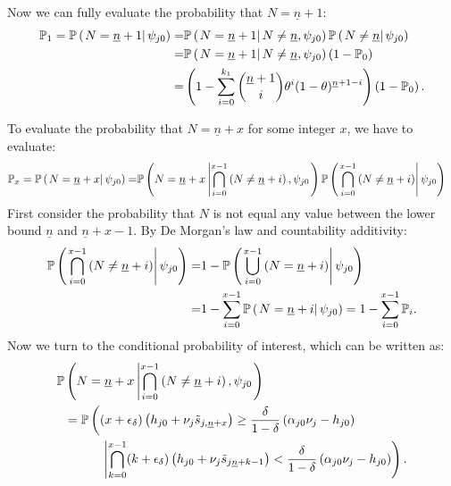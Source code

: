 Now we can fully evaluate the probability that $N = \underline{n} + 1$:
\begin{align*}
    \mathbb{P}_1 
    = 
    \mathbb{P} \left( \left. N = \underline{n} + 1 \right\vert \psi_{j0} \right) 
    =& 
    \mathbb{P} \left( \left. N = \underline{n} + 1 \right\vert N \neq \underline{n}, \psi_{j0} \right)
    \mathbb{P} \left( \left. N \neq \underline{n} \right\vert \psi_{j0} \right)
    \\
    =&
    \mathbb{P} \left( \left. N = \underline{n} + 1 \right\vert N \neq \underline{n}, \psi_{j0} \right) 
    \left( 1 - \mathbb{P}_0 \right)
    \\
    =&
    \left( 1 
        - 
        \sum_{i=0}^{k_1}
        \binom{\underline{n} + 1}{i}
        \theta^i
        (1 - \theta)^{\underline{n} + 1 - i}
     \right)
\left( 1 - \mathbb{P}_0 \right).
\end{align*}

To evaluate the probability that $N = \underline{n} + x$ for some integer $x$, we have to evaluate:
\begin{align*}
    \mathbb{P}_x = \mathbb{P} \left( \left. N = \underline{n} + x \right\vert \psi_{j0} \right) 
    =&
    \mathbb{P}  \left( 
        N = \underline{n} + x
     \left\vert 
    \bigcap_{i=0}^{x-1}
        \left( N \neq \underline{n} + i \right)
    , \psi_{j0} \right. \right)
    \mathbb{P} \left( \left. 
        \bigcap_{i=0}^{x-1}
        \left( N \neq \underline{n} + i \right)
     \right\vert \psi_{j0} \right)  
\end{align*} 
First consider the probability that $N$ is not equal any value between the lower bound $\underline{n}$ and $\underline{n} + x - 1$. By De Morgan's law and countability additivity:
\begin{align*}
    \mathbb{P} \left( \left. 
        \bigcap_{i=0}^{x-1}
        \left( N \neq \underline{n} + i \right)
     \right\vert \psi_{j0} \right)
    =&
    1
    -
    \mathbb{P}
    \left( \left. 
        \bigcup_{i=0}^{x-1}
        \left( N = \underline{n} + i \right)
     \right\vert \psi_{j0} \right)
    \\
    =&
    1
    -
    \sum_{i=0}^{x-1}
    \mathbb{P}
    \left( \left. 
        N = \underline{n} + i
     \right\vert \psi_{j0} \right)
    =
    1
    -
    \sum_{i=0}^{x-1}
    \mathbb{P}_i.
\end{align*}
Now we turn to the conditional probability of interest, which can be written as:
\begin{align}
    \nonumber
    \PP  &\pr{\crs{
        N = \underline{n} + x
    }{
    \bigcap_{i=0}^{x-1}
        \pr{N \neq \underline{n} + i}
    , \psi_{j0}}}
    \\ 
    \label{eq:prob_n_plus_x_long}
    &=
    \PP \left( 
        (x + \epsilon_\delta)
        \pr{h_{j0} + \nu_j \ks[, \underline{n} +x]
        }
        \geq
        \frac{\delta}{1 - \delta}
        \pr{\alpha_{j0} \nu_j - h_{j0}}
    \right.
    \\ \nonumber
    &\quad\quad\quad\left\vert
        \bigcap_{k=0}^{x - 1}
        (k + \epsilon_\delta)
        \pr{h_{j0} + \nu_j \ks[\underline{n} + k - 1]
        }
        <
        \frac{\delta}{1 - \delta}
        \pr{\alpha_{j0} \nu_j - h_{j0}}
    \right).
\end{align}
